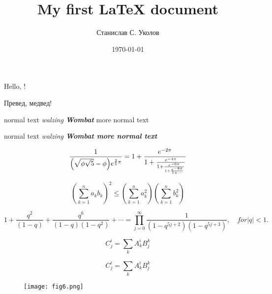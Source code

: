 \documentclass[12pt]{article}
\begin{document}
\title{My first \LaTeX{} document}
\author{Станислав С. Уколов}
\date{\today}
\maketitle

\vfill

Hello, \hfill\LaTeXe{}!

Превед, медвед!

\begin{landscape}

normal text {\itshape walzing \bfseries Wombat} more normal text \hrulefill

normal text \bgroup\itshape walzing \bfseries Wombat\egroup{} more normal text

\[
\frac{1}{\Bigl(\sqrt{\phi \sqrt{5}}-\phi\Bigr) e^{\frac25 \pi}} = 1+\frac{e^{-2\pi}} {1+\frac{e^{-4\pi}} {1+\frac{e^{-6\pi}} {1+\frac{e^{-8\pi}} {1+\cdots} } } }
\]

\[
\left( \sum_{k=1}^n a_k b_k \right)^2 \leq \left( \sum_{k=1}^n a_k^2 \right) \left( \sum_{k=1}^n b_k^2 \right)
\]

\[
1 +  \frac{q^2}{(1-q)}+\frac{q^6}{(1-q)(1-q^2)}+\cdots = \prod_{j=0}^{\infty}\frac{1}{(1-q^{5j+2})(1-q^{5j+3})}, \quad for | q |<1.
\]

\dotfill

\begin{equation}
   C^i_j = {\textstyle \sum_k} A^i_k B^k_j
\end{equation}

\begin{equation}
   C^i_j =  \sum_k A^i_k B^k_j
\end{equation}

\begin{figure}[h]
\centering
\texttt{[image: fig6.png]} 
\end{figure}

\end{landscape}
\end{document}
